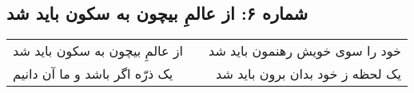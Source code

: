 \begin{center}
\section*{شماره ۶: از عالمِ بیچون به سکون باید شد}
\label{sec:006}
\begin{longtable}{l p{0.5cm} r}
از عالمِ بیچون به سکون باید شد
&&
خود را سوی خویش رهنمون باید شد
\\
یک ذرّه اگر باشد و ما آن دانیم
&&
یک لحظه ز خود بدان برون باید شد
\\
\end{longtable}
\end{center}
